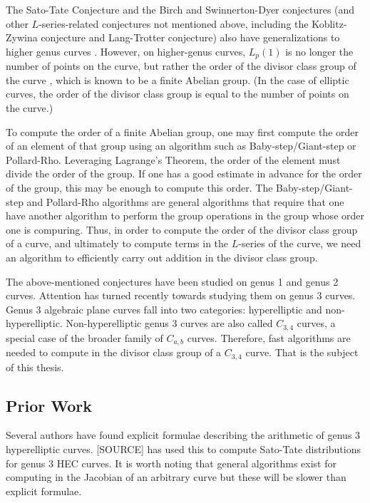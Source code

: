 The Sato-Tate Conjecture and the Birch and Swinnerton-Dyer conjectures
(and other $L$-series-related conjectures not mentioned above,
including the Koblitz-Zywina conjecture and Lang-Trotter conjecture)
also have generalizations to higher genus curves \cite{sutherland16-2} \cite{sutherland-18}.
However, on higher-genus curves, $L_p(1)$ is no longer the number of points on the curve,
but rather the order of the divisor class group of the curve \cite{sutherland08},
which is known to be a finite Abelian group.
(In the case of elliptic curves, the order of the divisor class group is
equal to the number of points on the curve.)

To compute the order of a finite Abelian group, one may first compute the order of an element of that group
using an algorithm such as Baby-step/Giant-step or Pollard-Rho.
Leveraging Lagrange's Theorem, the order of the element must divide the order of the group.
If one has a good estimate in advance for the order of the group, this may be enough
to compute this order.
The Baby-step/Giant-step and Pollard-Rho algorithms are general algorithms that
require that one have another algorithm to perform the group operations in the group
whose order one is compuring.
Thus, in order to compute the order of the divisor class group of a curve,
and ultimately to compute terms in the $L$-series of the curve,
we need an algorithm to efficiently carry out addition in the divisor class group.

The above-mentioned conjectures have been studied on genus 1 and genus 2 curves.
Attention has turned recently towards studying them on genus 3 curves.
Genus 3 algebraic plane curves fall into two categories: hyperelliptic and non-hyperelliptic.
Non-hyperelliptic genus 3 curves are also called $C_{3,4}$ curves, a special case of the broader family of $C_{a,b}$ curves.
Therefore, fast algorithms are needed to compute in the divisor class group of a $C_{3,4}$ curve.
That is the subject of this thesis.




\subsection{Prior Work}

Several authors have found explicit formulae describing the arithmetic of genus 3 hyperelliptic curves.
[SOURCE] has used this to compute Sato-Tate distributions for genus 3 HEC curves.
It is worth noting that general algorithms exist for computing in the Jacobian of an arbitrary curve
but these will be slower than explicit formulae.

